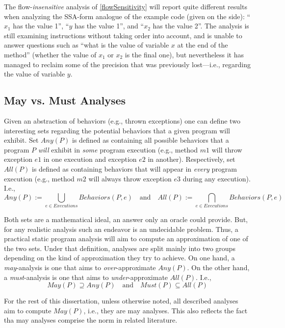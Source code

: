 The flow-\emph{insensitive} analysis of \ref{flowSensitivity} will report quite
different results when analyzing the SSA-form analogue of the example code
(given on the side): ``$x_1$ has the value 1'', ``$y$ has the value 1'', and
``$x_2$ has the value 2''. The analysis is still examining instructions without
taking order into account, and is unable to answer questions such as ``what is
the value of variable $x$ at the end of the method'' (whether the value of
$x_1$ or $x_2$ is the final one), but nevertheless it has managed to reclaim
some of the precision that was previously lost---i.e., regarding the value of
variable $y$.


\subsection{May vs. Must Analyses}

Given an abstraction of behaviors (e.g., thrown exceptions) one can define two
interesting sets regarding the potential behaviors that a given program will
exhibit. Set $Any(P)$ is defined as containing all possible behaviors that a
program $P$ \emph{will} exhibit in \emph{some} program execution (e.g., method
$m1$ will throw exception $e1$ in one execution and exception $e2$ in another).
Respectively, set $All(P)$ is defined as containing behaviors that will appear
in \emph{every} program execution (e.g., method $m2$ will always throw
exception $e3$ during any execution). I.e.,
\[
Any(P) := \bigcup_{e \in Executions} Behaviors(P, e)
\quad \textrm{and} \quad
All(P) := \bigcap_{e \in Executions} Behaviors(P, e)
\]

Both sets are a mathematical ideal, an answer only an oracle could provide.
But, for any realistic analysis such an endeavor is an undecidable problem.
Thus, a practical static program analysis will aim to compute an approximation
of one of the two sets. Under that definition, analyses are split mainly into
two groups depending on the kind of approximation they try to achieve. On one
hand, a \emph{may}-analysis is one that aims to \emph{over}-approximate
$Any(P)$. On the other hand, a \emph{must}-analysis is one that aims to
\emph{under}-approximate $All(P)$. I.e.,
\[
May(P) \supseteq Any(P) \quad \textrm{and} \quad Must(P) \subseteq All(P)
\]

For the rest of this dissertation, unless otherwise noted, all described analyses
aim to compute $May(P)$, i.e., they are may analyses. This also reflects the fact
tha may analyses comprise the norm in related literature.


